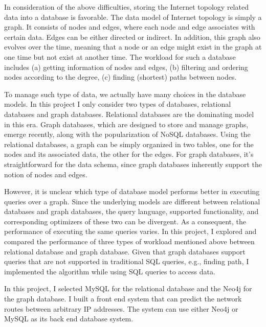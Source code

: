 \documentclass[letterpaper,twocolumn,11pt]{article}
\begin{document}
In consideration of the above difficulties, storing the Internet topology related data into a database is favorable. The data model of Internet topology is simply a graph. It consists of nodes and edges, where each node and edge associates with certain data. Edges can be either directed or indirect. In addition, this graph also evolves over the time, meaning that a node or an edge might exist in the graph at one time but not exist at another time. The workload for such a database includes (a) getting information of nodes and edges, (b) filtering and ordering nodes according to the degree, (c) finding (shortest) paths between nodes.

To manage such type of data, we actually have many choices in the database models. In this project I only consider two types of databases, relational databases and graph databases. Relational databases are the dominating model in this era. Graph databases, which are designed to store and manage graphs, emerge recently, along with the popularization of NoSQL databases. Using the relational databases, a graph can be simply organized in two tables, one for the nodes and its associated data, the other for the edges. For graph databases, it's straightforward for the data schema, since graph databases inherently support the notion of nodes and edges. 

However, it is unclear which type of database model performs better in executing queries over a graph. 
Since the underlying models are different between relational databases and graph databases, the query language, supported functionality, and corresponding optimizers of these two can be divergent. As a consequent, the performance of executing the same queries varies. 
In this project, I explored and compared the performance of three types of workload mentioned above between relational database and graph database. Given that graph databases support queries that are not supported in traditional SQL queries, e.g., finding path, I implemented the algorithm while using SQL queries to access data.

In this project, I selected MySQL \cite{mysql} for the relational database and the Neo4j \cite{neo4j} for the graph database. I built a front end system that can predict the network routes between arbitrary IP addresses. The system can use either Neo4j or MySQL as its back end database system. 
\end{document}
